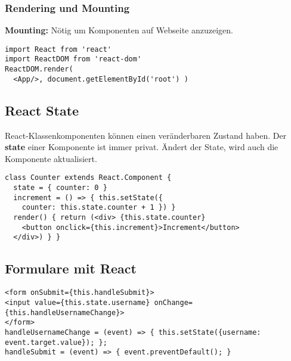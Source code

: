 \subsubsection{Rendering und Mounting}
\textbf{Mounting:} Nötig um Komponenten auf Webseite anzuzeigen.
\begin{lstlisting}[style=htmlcssjs]
import React from 'react'
import ReactDOM from 'react-dom'
ReactDOM.render(
  <App/>, document.getElementById('root') )
\end{lstlisting}
\subsection{React State}
React-Klassenkomponenten können einen veränderbaren Zustand haben. Der \textbf{state} einer Komponente ist immer privat. Ändert der State, wird auch die Komponente aktualisiert.
\begin{lstlisting}[style=htmlcssjs]
class Counter extends React.Component {
  state = { counter: 0 }
  increment = () => { this.setState({
    counter: this.state.counter + 1 }) }
  render() { return (<div> {this.state.counter}
    <button onclick={this.increment}>Increment</button>
  </div>) } }
\end{lstlisting}
\subsection{Formulare mit React}
\begin{lstlisting}[style=htmlcssjs]
<form onSubmit={this.handleSubmit}>
<input value={this.state.username} onChange={this.handleUsernameChange}>
</form>
handleUsernameChange = (event) => { this.setState({username: event.target.value}); };
handleSubmit = (event) => { event.preventDefault(); }
\end{lstlisting}
